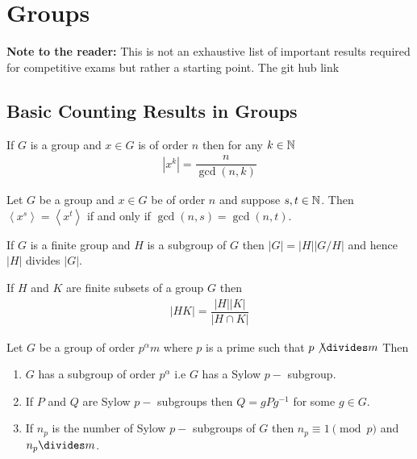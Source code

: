 \chapter{Groups}

\textbf{Note to the reader:} This is not an exhaustive list of important results required for competitive exams but rather a starting point. The git hub link 
                          
\section{Basic Counting Results in Groups}

\begin{theorem}
	If $G$ is a group and $x\in G$ is of order $n$ then for any $k\in \mathbb{N}$
	\begin{align*}
		|x^k|=\dfrac{n}{\gcd(n,k)}
	\end{align*} 	
\end{theorem}

\begin{theorem}
	Let $G$ be a group and $x\in G$ be of order $n$ and suppose $s,t\in \mathbb{N}$. Then $\left\langle x^s\right\rangle=\left\langle x^t\right\rangle$ if and only if $\gcd(n,s)=\gcd(n,t)$.
\end{theorem}

\begin{theorem}
	If $G$ is a finite group and $H$ is a subgroup of $G$ then $|G|=|H||G/H|$ and hence $|H|$ divides $|G|$.
\end{theorem}

\begin{theorem}
	If $H$ and $K$ are finite subsets of a group $G$ then 
	\begin{align}
		|HK|=\dfrac{|H||K|}{|H\cap K|}
	\end{align}
\end{theorem}

\begin{theorem}
	Let $G$ be a group of order $p^\alpha m$ where $p$ is a prime such that $p\not\divides m$ Then 
	\begin{enumerate}
		\item 
		$G$ has a subgroup of order $p^\alpha$ i.e $G$ has a Sylow $p-$ subgroup.
		\item 
		If $P$ and $Q$ are Sylow $p-$ subgroups then $Q=gPg^{-1}$ for some $g\in G$.
		\item 
		If $n_p$ is the number of Sylow $p-$ subgroups of $G$ then $n_p\equiv 1\pmod p$ and $n_p\divides m$.
	\end{enumerate}
\end{theorem}

